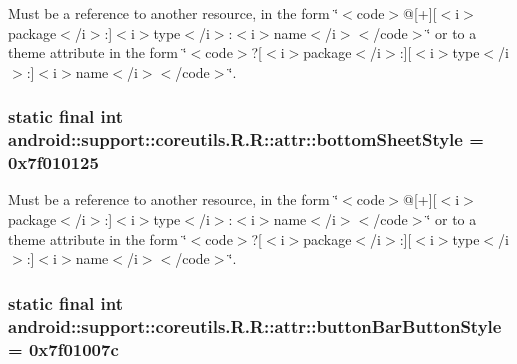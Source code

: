 Must be a reference to another resource, in the form \char`\"{}$<$code$>$@\mbox{[}+\mbox{]}\mbox{[}$<$i$>$package$<$/i$>$:\mbox{]}$<$i$>$type$<$/i$>$:$<$i$>$name$<$/i$>$$<$/code$>$\char`\"{} or to a theme attribute in the form \char`\"{}$<$code$>$?\mbox{[}$<$i$>$package$<$/i$>$:\mbox{]}\mbox{[}$<$i$>$type$<$/i$>$:\mbox{]}$<$i$>$name$<$/i$>$$<$/code$>$\char`\"{}. \hypertarget{classandroid_1_1support_1_1coreutils_1_1_r_1_1attr_921ead6b05ec8fcf33c42b601264dbd7}{
\subsubsection[{bottomSheetStyle}]{\setlength{\rightskip}{0pt plus 5cm}static final int android::support::coreutils.R.R::attr::bottomSheetStyle = 0x7f010125}}
\label{classandroid_1_1support_1_1coreutils_1_1_r_1_1attr_921ead6b05ec8fcf33c42b601264dbd7}


Must be a reference to another resource, in the form \char`\"{}$<$code$>$@\mbox{[}+\mbox{]}\mbox{[}$<$i$>$package$<$/i$>$:\mbox{]}$<$i$>$type$<$/i$>$:$<$i$>$name$<$/i$>$$<$/code$>$\char`\"{} or to a theme attribute in the form \char`\"{}$<$code$>$?\mbox{[}$<$i$>$package$<$/i$>$:\mbox{]}\mbox{[}$<$i$>$type$<$/i$>$:\mbox{]}$<$i$>$name$<$/i$>$$<$/code$>$\char`\"{}. \hypertarget{classandroid_1_1support_1_1coreutils_1_1_r_1_1attr_da2947abc3724b47a61944e285ba0904}{
\subsubsection[{buttonBarButtonStyle}]{\setlength{\rightskip}{0pt plus 5cm}static final int android::support::coreutils.R.R::attr::buttonBarButtonStyle = 0x7f01007c}}
\label{classandroid_1_1support_1_1coreutils_1_1_r_1_1attr_da2947abc3724b47a61944e285ba0904}


